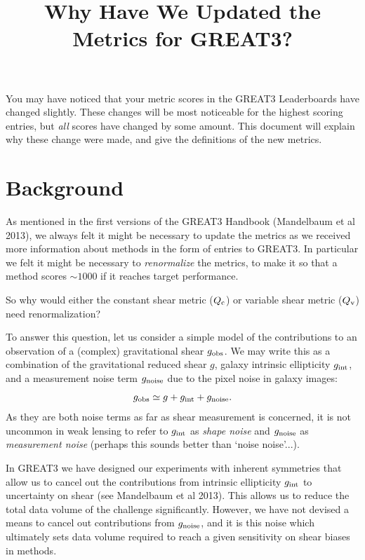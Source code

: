 \documentclass[preprint,11pt]{aastex}
\begin{document}
\setlength{\parskip}{2.0ex plus 0.5ex minus 0.5ex}
\setlength{\parindent}{0cm} 

\title{Why Have We Updated the Metrics for GREAT3?}

You may have noticed that your metric scores in the GREAT3
Leaderboards have changed slightly.  These changes will be most
noticeable for the highest scoring entries, but \emph{all} scores have
changed by some amount.  This document will explain why these change
were made, and give the definitions of the new metrics.

\section{Background}\label{sec:bg}
As mentioned in the first versions of the GREAT3 Handbook (Mandelbaum
et al 2013), we always felt it
might be necessary to update the metrics as we received more
information about methods in the form of entries to GREAT3.  In
particular we felt it might be necessary to \emph{renormalize} the
metrics, to make it so that a method scores $\sim 1000$ if it reaches
target performance.

So why would either the constant shear metric ($Q_{\rm c}$) or
variable shear metric ($Q_{\rm v}$) need renormalization?

To answer this question, let us consider a simple model of the
contributions to an observation of a (complex) gravitational shear $g_{\rm obs}$.
We may write this as a combination of the gravitational reduced shear $g$, galaxy intrinsic ellipticity
$g_{\rm int}$, and a measurement noise term $g_{\rm noise}$ due to the
pixel noise in galaxy images:
\begin{equation}
g_{\rm obs} \simeq g + g_{\rm int} + g_{\rm noise}.
\end{equation}
As they are both noise terms as far as shear measurement is concerned,
it is not uncommon in weak lensing to refer to $g_{\rm int}$ as \emph{shape
  noise} and $g_{\rm noise}$ as \emph{measurement noise} (perhaps this sounds
better than `noise noise'...).

In GREAT3 we have designed our experiments with inherent symmetries
that allow us to cancel out the contributions from intrinsic ellipticity
$g_{\rm int}$ to uncertainty on shear (see Mandelbaum et al 2013).
This allows us to reduce the  total data volume of the challenge
significantly.  However, we have not devised a means to cancel out
contributions from $g_{\rm noise}$, and it is this noise which
ultimately sets data volume required to reach a given sensitivity on
shear biases in methods.
\end{document}
